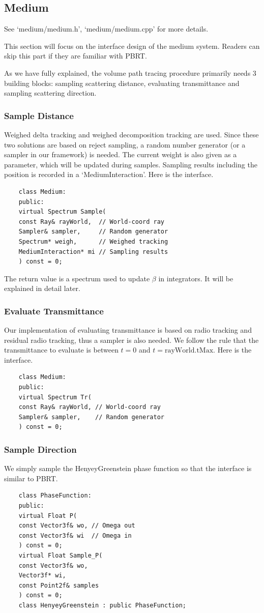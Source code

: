 \documentclass[acmtog]{acmart}
\begin{document}
\subsection{Medium}
See `medium/medium.h', `medium/medium.cpp' for more details.\par
This section will focus on the interface design of the medium system.
Readers can skip this part if they are familiar with PBRT.\par
As we have fully explained, the volume path tracing procedure primarily needs 3 building blocks:
sampling scattering distance, evaluating transmittance and sampling scattering direction.\par
\subsubsection{Sample Distance}
Weighed delta tracking and weighed decomposition tracking are used.
Since these two solutions are based on reject sampling, a random number generator (or a sampler in our framework) is needed.
The current weight is also given as a parameter, which will be updated during samples.
Sampling results including the position is recorded in a `MediumInteraction'.
Here is the interface.
\begin{lstlisting}
	class Medium:
	public:
	virtual Spectrum Sample(
	const Ray& rayWorld,  // World-coord ray
	Sampler& sampler,     // Random generator
	Spectrum* weigh,      // Weighed tracking
	MediumInteraction* mi // Sampling results
	) const = 0;
\end{lstlisting}
The return value is a spectrum used to update $\beta$ in integrators.
It will be explained in detail later.
\subsubsection{Evaluate Transmittance}
Our implementation of evaluating transmittance is based on radio tracking and residual radio tracking, thus a sampler is also needed.
We follow the rule that the transmittance to evaluate is between $t = 0$ and $t = \mathrm{rayWorld.tMax}$.
Here is the interface.
\begin{lstlisting}
	class Medium:
	public:
	virtual Spectrum Tr(
	const Ray& rayWorld, // World-coord ray
	Sampler& sampler,    // Random generator
	) const = 0;
\end{lstlisting}
\subsubsection{Sample Direction}
We simply sample the HenyeyGreenstein phase function so that the interface is similar to PBRT.
\begin{lstlisting}
	class PhaseFunction:
	public:
	virtual Float P(
	const Vector3f& wo, // Omega out
	const Vector3f& wi  // Omega in
	) const = 0;
	virtual Float Sample_P(
	const Vector3f& wo, 
	Vector3f* wi, 
	const Point2f& samples
	) const = 0;
	class HenyeyGreenstein : public PhaseFunction;
\end{lstlisting}
\end{document}
